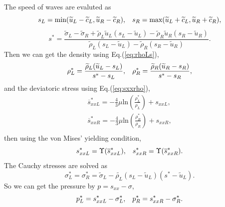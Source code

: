 \documentclass{article}
\numberwithin{equation}{section}
\numberwithin{table}{section}
\begin{document}
The speed of waves are evaluted as
\begin{equation}
  s_L = \text{min} (\widetilde{u}_L-\widetilde{c}_L, \widetilde{u}_R-\widetilde{c}_R), \hspace{0.3cm} s_R = \text{max}(\widetilde{u}_L+\widetilde{c}_L, \widetilde{u}_R+\widetilde{c}_R),
	\end{equation}
	\begin{equation}
	  s^* = \frac{\widetilde{\sigma}_L-\widetilde{\sigma}_R+\widetilde{\rho}_L \widetilde{u}_L(s_L-\widetilde{u}_L)-\widetilde{\rho}_R \widetilde{u}_R(s_R-\widetilde{u}_R)}{\widetilde{\rho}_L(s_L-\widetilde{u}_L)-\widetilde{\rho}_R(s_R-\widetilde{u}_R)}.
\end{equation}
Then we can get the density using Eq.(\ref{eq:rhoLs}),
\begin{equation}
  \rho_L^* = \frac{\widetilde{\rho}_L(\widetilde{u}_L-s_L)}{s^*-s_L}, \hspace{0.3cm}  \rho_R^* = \frac{\widetilde{\rho}_R(\widetilde{u}_R-s_R)}{s^*-s_R},
\end{equation}
and the deviatoric stress using Eq.(\ref{eq:sxxrho}),
  \begin{align}
  \overline{s}_{xxL}^* =  -\frac{4}{3}\mu \text{ln}\left( \frac{\rho_L^*}{\rho_L}  \right)+s_{xxL},\\
  \overline{s}_{xxR}^* =  -\frac{4}{3}\mu \text{ln}\left( \frac{\rho_R^*}{\rho_R}  \right)+s_{xxR},\\
\end{align}
then using  the von Mises' yielding condition,
\begin{equation}
  s_{xxL}^* = \Upsilon(\overline{s}_{xxL}^*) , \hspace{0.3cm}  s_{xxR}^* = \Upsilon(\overline{s}_{xxR}^*).
\end{equation}
The Cauchy stresses  are solved as
\begin{equation}
  \sigma_L^*=\sigma_R^*=\widetilde{\sigma}_L -\widetilde{\rho_L} (s_L-\widetilde{u}_L)(s^*-\widetilde{u}_L).
\end{equation}
So we can get the pressure by $p =s_{xx}-\sigma$,
\begin{equation}
  p_L^* = s_{xxL}^* - \sigma_L^*, \hspace{0.3cm}   p_R^* = s_{xxR}^* - \sigma_R^*.
\end{equation}
\end{document}
